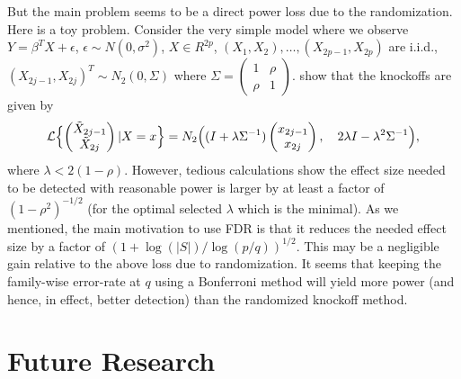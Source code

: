 \documentclass[article,lineno]{biometrika}
\begin{document}
	
	But the main problem seems to be  a direct power loss due to the randomization.
	Here is a toy problem.
	Consider the very simple model where we observe $Y=\beta^T X+\epsilon$, $\epsilon\sim N(0,\sigma^2)$, $X\in R^{2p}$, $(X_1,X_2),\dots,(X_{2p-1},X_{2p})$ are i.i.d.,   $(X_{2j-1},X_{2j})^T\sim N_2(0,\Sigma)$ where $\Sigma=\begin{pmatrix}1 & \rho\\\rho &1\end{pmatrix}$.
	\citet{CandesPanninggoldmodelX2018} show that the knockoffs are given by
	\begin{equation*}
		\begin{split}
			{\mathcal L}\Bigl\{\begin{pmatrix}\tilde X_{2j-1}\\\tilde X_{2j}\end{pmatrix}|X=x\Bigr\} = N_2\Bigl((I+\lambda \Sigma^{-1})\begin{pmatrix}x_{2j-1}\\x_{2j}\end{pmatrix},\hspace{1em} 2\lambda I-\lambda^2\Sigma^{-1}\Bigr),
		\end{split}
	\end{equation*}
	where $\lambda<2(1-\rho)$.
	However, tedious calculations show the effect size needed to be detected with reasonable power is larger by at least a factor of $(1-\rho^2)^{-1/2}$ (for the optimal selected $\lambda$ which is the minimal). As we mentioned, the main motivation to use FDR is that it reduces the needed effect size by a factor of $(1+\log(|S|)/\log(p/q))^{1/2}$.
	This may be a negligible gain relative to the above loss due to randomization.
	It seems that keeping the family-wise error-rate at $q$ using a Bonferroni method will yield more power (and hence, in effect, better detection) than the randomized knockoff method.
	
	
	
	
	
	
	
	\section{Future Research}
	
\end{document}
